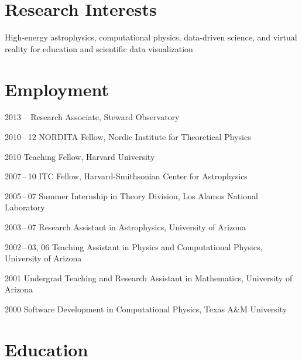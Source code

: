 \section*{Research Interests}

High-energy astrophysics, computational physics, data-driven science,
and virtual reality for education and scientific data visualization

\section*{Employment}

\begin{tlist}

\item[2013\,--\,] Research Associate, Steward Observatory

\item[2010\,--\,12] NORDITA Fellow, Nordic Institute for Theoretical Physics

\item[2010] Teaching Fellow, Harvard University

\item[2007\,--\,10] ITC Fellow, Harvard-Smithsonian Center for Astrophysics

\item[2005\,--\,07] Summer Internship in Theory Division,
  Los Alamos National Laboratory

\item[2003\,--\,07] Research Assistant in Astrophysics, University of Arizona

\item[2002\,--\,03, 06] Teaching Assistant in Physics and
  Computational Physics, University of Arizona

\item[2001] Undergrad Teaching and Research Assistant in Mathematics,
  University of Arizona

\item[2000] Software Development in Computational Physics,
  Texas A\&M University

\end{tlist}

\section*{Education}

